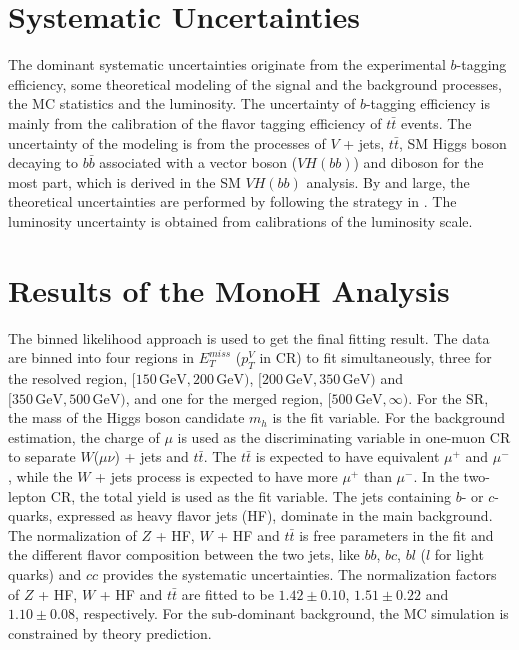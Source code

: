 \documentclass[class=NTHU_thesis, crop=false]{standalone}
\begin{document}
\section{Systematic Uncertainties}
The dominant systematic uncertainties originate from the experimental $b$-tagging efficiency, some theoretical modeling of the signal and the background processes, the MC statistics and the luminosity. The uncertainty of $b$-tagging efficiency is mainly from the calibration of the flavor tagging efficiency of $t\bar{t}$ events\cite{ATL-PHYS-PUB-2017-013}\cite{1512.01094}. The uncertainty of the modeling is from the processes of $V$ + jets, $t\bar{t}$, SM Higgs boson decaying to $b\bar{b}$ associated with a vector boson ($VH(bb)$) and diboson for the most part, which is derived in the SM $VH(bb)$ analysis\cite{Pandini:2111370}\cite{Robson:2235887}. By and large, the theoretical uncertainties are performed by following the strategy in \cite{ATLAS-CONF-2018-036}. The luminosity uncertainty is obtained from calibrations of the luminosity scale\cite{Aaboud2016}.

\section{Results of the MonoH Analysis}
The binned likelihood approach is used to get the final fitting result. The data are binned into four regions in $E^{miss}_T$ ($p^V_T$ in CR) to fit simultaneously, three for the resolved region, $[150\, \mathrm{GeV}, 200\, \mathrm{GeV})$, $[200\, \mathrm{GeV}, 350\, \mathrm{GeV})$ and $[350\, \mathrm{GeV}, 500\, \mathrm{GeV})$, and one for the merged region, $[500\, \mathrm{GeV}, \infty)$. For the SR, the mass of the Higgs boson candidate $m_h$ is the fit variable. For the background estimation, the charge of $\mu$ is used as the discriminating variable in one-muon CR to separate $W$($\mu\nu$) + jets and $t\bar{t}$. The $t\bar{t}$ is expected to have equivalent $\mu^+$ and $\mu^-$, while the $W$ + jets process is expected to have more $\mu^+$ than $\mu^-$. In the two-lepton CR, the total yield is used as the fit variable. The jets containing $b$- or $c$-quarks, expressed as heavy flavor jets (HF), dominate in the main background. The normalization of $Z$ + HF, $W$ + HF and $t\bar{t}$ is free parameters in the fit and the different flavor composition between the two jets, like $bb$, $bc$, $bl$ ($l$ for light quarks) and $cc$ provides the systematic uncertainties. The normalization factors of $Z$ + HF, $W$ + HF and $t\bar{t}$ are fitted to be $1.42 \pm 0.10$, $1.51 \pm 0.22$ and $1.10 \pm 0.08$, respectively. For the sub-dominant background, the MC simulation is constrained by theory prediction.
\end{document}
